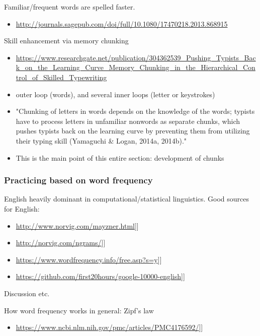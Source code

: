 \documentclass[11pt]{article}
\begin{document}
Familiar/frequent words are spelled faster.

\begin{itemize}
\item \url{http://journals.sagepub.com/doi/full/10.1080/17470218.2013.868915}
\end{itemize}

Skill enhancement via memory chunking

\begin{itemize}
\item \url{https://www.researchgate.net/publication/304362539\_Pushing\_Typists\_Back\_on\_the\_Learning\_Curve\_Memory\_Chunking\_in\_the\_Hierarchical\_Control\_of\_Skilled\_Typewriting}

\item outer loop (words), and several inner loops (letter or keystrokes)
\item "Chunking of letters in words depends on the knowledge of the words; typists have to process letters in unfamiliar nonwords as separate chunks, which pushes typists back on the learning curve by preventing them from utilizing their typing skill (Yamaguchi \& Logan, 2014a, 2014b)."
\item This is the main point of this entire section: development of chunks
\end{itemize}

\subsubsection{Practicing based on word frequency}
\label{sec:org30ba53e}

English heavily dominant in computational/statistical linguistics. Good sources for English:

\begin{itemize}
\item \url{http://www.norvig.com/mayzner.html}]]
\item \url{http://norvig.com/ngrams/}]]
\item \url{https://www.wordfrequency.info/free.asp?s=y}]]
\item \url{https://github.com/first20hours/google-10000-english}]]
\end{itemize}

Discussion etc.

How word frequency works in general: Zipf's law

\begin{itemize}
\item \url{https://www.ncbi.nlm.nih.gov/pmc/articles/PMC4176592/}]]
\end{itemize}
\end{document}
